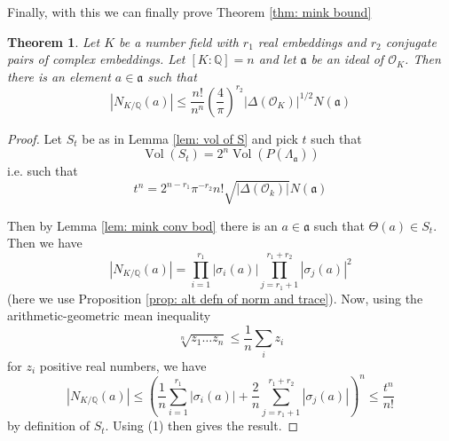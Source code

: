 \documentclass[11pt,a4paper]{report}
\theoremstyle{plain}
\newtheorem*{thm*}{Theorem}
\theoremstyle{definition}
\theoremstyle{definition}
\def\QQ{\mathbb{Q}}
\def \s {\sigma}
\def \OO {\mathcal{O}}
\def \s {\sigma}
\def\gotha{\mathfrak{a}}
\DeclareMathOperator{\Vol}{Vol}
\begin{document}
Finally, with this we can finally prove Theorem \ref{thm: mink bound}

\begin{thm*}
	Let $K$ be a number field with $r_1$ real embeddings and $r_2$ conjugate pairs of complex embeddings. Let $[K:\QQ]=n$ and let $\gotha$ be an ideal of $\OO_K$. Then there is an element $a \in \gotha$ such that \[|N_{K/\QQ}(a)| \leq  \frac{n!}{n^n} \left( \frac{4}{\pi} \right)^{r_2} |\Delta(\OO_K)|^{1/2} N(\gotha) \]
\end{thm*} 

\begin{proof}
	Let $S_t$ be as in Lemma \ref{lem: vol of S} and pick $t$ such that \[\Vol(S_t)=2^n \Vol(P(\Lambda_\gotha))\] i.e. such that \[t^n=2^{n-r_1}\pi^{-r_2}n! \sqrt{|\Delta(\OO_k)|} N(\gotha) \tag{1}\]	
	
	Then by Lemma \ref{lem: mink conv bod} there is an $a \in \gotha$ such that $\Theta(a) \in S_t$. Then we have \[|N_{K/\QQ}(a)|= \prod_{i=1}^{r_1} |\s_i(a)| \prod_{j=r_1+1}^{r_1+r_2} |\s_j(a)|^2 \] (here we use Proposition \ref{prop: alt defn of norm and trace}). Now, using the arithmetic-geometric mean inequality \[\sqrt[n]{z_1\dots z_n} \leq \frac{1}{n} \sum_i z_i\] for $z_i$ positive real numbers, we have \[|N_{K/\QQ}(a)| \leq \left( \frac{1}{n}\sum_{i=1}^{r_1} |\s_i(a)|+ \frac{2}{n}\sum_{j=r_1+1}^{r_1+r_2} |\s_j(a)| \right)^n \leq \frac{t^n}{n!}\] by definition of $S_t$. 	Using (1) then gives the result.
	
\end{proof}







\end{document}

